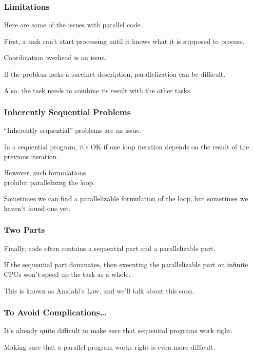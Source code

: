 \begin{frame}
\frametitle{Limitations}
\Large
Here are some of the issues with parallel code.

First, a task can't start processing until it knows what it
is supposed to process. 

Coordination overhead is an issue. 

If the
problem lacks a succinct description, parallelization can be
difficult. 

Also, the task needs to combine its result with the other
tasks.

\end{frame}



\begin{frame}
\frametitle{Inherently Sequential Problems}
\Large

``Inherently sequential'' problems are an issue. 

In a sequential 
program, it's OK if one loop iteration depends on the result of the
previous iteration. 

However, such formulations \\
prohibit parallelizing
the loop. 

Sometimes we can find a parallelizable formulation of the loop,
but sometimes we haven't found one yet.

\end{frame}




\begin{frame}
\frametitle{Two Parts}
\Large

Finally, code often contains a sequential part and a parallelizable
part.  

If the sequential part dominates, then
executing the parallelizable part on infinite CPUs won't speed up the task as a whole. 

This is
known as Amdahl's Law, and we'll talk about this soon.


\end{frame}



\begin{frame}
\frametitle{To Avoid Complications\ldots}
\Large

 It's already quite difficult to make sure that
sequential programs work right. 

Making sure that a parallel program
works right is even more difficult.
\end{frame}

